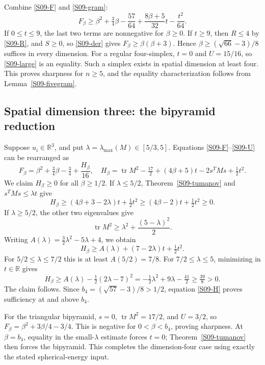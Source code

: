 \documentclass[11pt,a4paper]{article}
\theoremstyle{definition}\newtheorem{definition}[theorem]{Definition}
\theoremstyle{remark}\newtheorem{remark}[theorem]{Remark}
\newcommand{\R}{\mathbb R}\newcommand{\C}{\mathbb C}\newcommand{\N}{\mathbb N}
\DeclareMathOperator{\tr}{tr}\DeclareMathOperator{\supp}{supp}\DeclareMathOperator{\TV}{TV}
\numberwithin{equation}{section}
\begin{document}
Combine \eqref{S09-F} and \eqref{S09-gram}:
\begin{equation}\label{S09-large}
 F_\beta\ge\beta^2+\tfrac34\beta-\frac{57}{64}
       +\frac{8\beta+5}{32}t-\frac{t^2}{64}.
\end{equation}
If $0\le t\le9$, the last two terms are nonnegative for $\beta\ge0$. If $t\ge9$, then $R\le4$ by \eqref{S09-R}, and $S\ge0$, so \eqref{S09-der} gives $F_\beta\ge\beta(\beta+3)$. Hence $\beta\ge(\sqrt{66}-3)/8$ suffices in every dimension. For a regular four-simplex, $t=0$ and $U=15/16$, so \eqref{S09-large} is an equality. Such a simplex exists in spatial dimension at least four. This proves sharpness for $n\ge5$, and the equality characterization follows from Lemma~\ref{S09-fivegram}.

\subsection{Spatial dimension three: the bipyramid reduction}\label{S09-sec-4}
Suppose $u_i\in\R^3$, and put $\lambda=\lambda_{\max}(M)\in[5/3,5]$. Equations \eqref{S09-F}--\eqref{S09-U} can be rearranged as
\begin{equation}\label{S09-H}
 F_\beta=\beta^2+\tfrac34\beta-\tfrac34+\frac{H_\beta}{16},
\quad H_\beta=\tr M^2-\tfrac{17}{2}+(4\beta+5)t-2s^TMs+\tfrac12t^2.
\end{equation}
We claim $H_\beta\ge0$ for all $\beta\ge1/2$. If $\lambda\le5/2$, Theorem~\ref{S09-tumanov} and $s^TMs\le\lambda t$ give
\[
 H_\beta\ge(4\beta+3-2\lambda)t+\tfrac12t^2
 \ge(4\beta-2)t+\tfrac12t^2\ge0.
\]
If $\lambda\ge5/2$, the other two eigenvalues give
\[
 \tr M^2\ge\lambda^2+\frac{(5-\lambda)^2}{2}.
\]
Writing $A(\lambda)=\tfrac32\lambda^2-5\lambda+4$, we obtain
\[
 H_\beta\ge A(\lambda)+(7-2\lambda)t+\tfrac12t^2.
\]
For $5/2\le\lambda\le7/2$ this is at least $A(5/2)=7/8$. For $7/2\le\lambda\le5$, minimizing in $t\in\R$ gives
\[
 H_\beta\ge A(\lambda)-\tfrac12(2\lambda-7)^2
 =-\tfrac12\lambda^2+9\lambda-\tfrac{41}{2}\ge\tfrac{39}{8}>0.
\]
The claim follows. Since $b_4=(\sqrt{57}-3)/8>1/2$, equation \eqref{S09-H} proves sufficiency at and above $b_4$.

For the triangular bipyramid, $s=0$, $\tr M^2=17/2$, and $U=3/2$, so
$F_\beta=\beta^2+3\beta/4-3/4$. This is negative for $0<\beta<b_4$, proving sharpness. At $\beta=b_4$, equality in the small-$\lambda$ estimate forces $t=0$; Theorem~\ref{S09-tumanov} then forces the bipyramid. This completes the dimension-four case using exactly the stated spherical-energy input.
\end{document}
